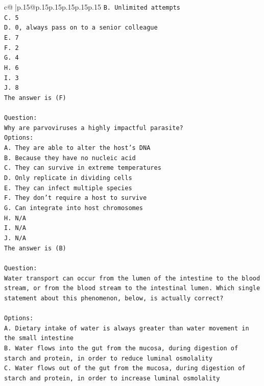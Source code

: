 \documentclass{article}
\begin{document}
{\begin{supertabular}{c@{$\;$}|p{.15\linewidth}@{}p{.15\linewidth}p{.15\linewidth}p{.15\linewidth}p{.15\linewidth}p{.15\linewidth}}
{{{\texttt{B. Unlimited attempts} \\
\texttt{C. 5} \\
\texttt{D. 0, always pass on to a senior colleague} \\
\texttt{E. 7} \\
\texttt{F. 2} \\
\texttt{G. 4} \\
\texttt{H. 6} \\
\texttt{I. 3} \\
\texttt{J. 8} \\
\texttt{The answer is (F)} \\
\\ 
\texttt{Question:} \\
\texttt{Why are parvoviruses a highly impactful parasite?} \\
\texttt{Options:} \\
\texttt{A. They are able to alter the host's DNA} \\
\texttt{B. Because they have no nucleic acid} \\
\texttt{C. They can survive in extreme temperatures} \\
\texttt{D. Only replicate in dividing cells} \\
\texttt{E. They can infect multiple species} \\
\texttt{F. They don't require a host to survive} \\
\texttt{G. Can integrate into host chromosomes} \\
\texttt{H. N/A} \\
\texttt{I. N/A} \\
\texttt{J. N/A} \\
\texttt{The answer is (B)} \\
\\ 
\texttt{Question:} \\
\texttt{Water transport can occur from the lumen of the intestine to the blood stream, or from the blood stream to the intestinal lumen. Which single statement about this phenomenon, below, is actually correct?} \\
\\ 
\texttt{Options:} \\
\texttt{A. Dietary intake of water is always greater than water movement in the small intestine} \\
\texttt{B. Water flows into the gut from the mucosa, during digestion of starch and protein, in order to reduce luminal osmolality} \\
\texttt{C. Water flows out of the gut from the mucosa, during digestion of starch and protein, in order to increase luminal osmolality} \\
}}}
\end{supertabular}}
\end{document}
